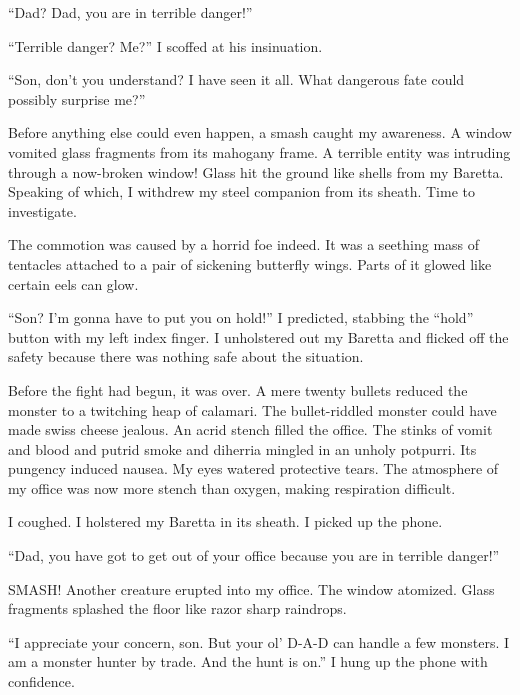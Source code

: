 ``Dad? Dad, you are in terrible danger!''

``Terrible danger? Me?'' I scoffed at his
insinuation.

``Son, don't you understand? I have seen it all. What
dangerous fate could possibly surprise me?''



Before anything else could even happen, a smash caught my
awareness. A window vomited glass fragments from its mahogany
frame. A terrible entity was intruding through a now-broken window!
Glass hit the ground like shells from my Baretta. Speaking of
which, I withdrew my steel companion from its sheath. Time to
investigate.



The commotion was caused by a horrid foe indeed. It was a seething
mass of tentacles attached to a pair of sickening butterfly wings.
Parts of it glowed like certain eels can glow.



``Son? I'm gonna have to put you on hold!'' I
predicted, stabbing the ``hold'' button with my left
index finger. I unholstered out my Baretta and flicked off the
safety because there was nothing safe about the situation.



Before the fight had begun, it was over. A mere twenty bullets
reduced the monster to a twitching heap of calamari. The
bullet-riddled monster could have made swiss cheese jealous. An
acrid stench filled the office. The stinks of vomit and blood and
putrid smoke and diherria mingled in an unholy potpurri. Its
pungency induced nausea. My eyes watered protective tears. The
atmosphere of my office was now more stench than oxygen, making
respiration difficult.



I coughed. I holstered my Baretta in its sheath. I picked up the
phone.

``Dad, you have got to get out of your office because you are
in terrible danger!''



SMASH! Another creature erupted into my office. The window
atomized. Glass fragments splashed the floor like razor sharp
raindrops.



``I appreciate your concern, son. But your ol' D-A-D can
handle a few monsters. I am a monster hunter by trade. And the hunt
is on.'' I hung up the phone with confidence.



